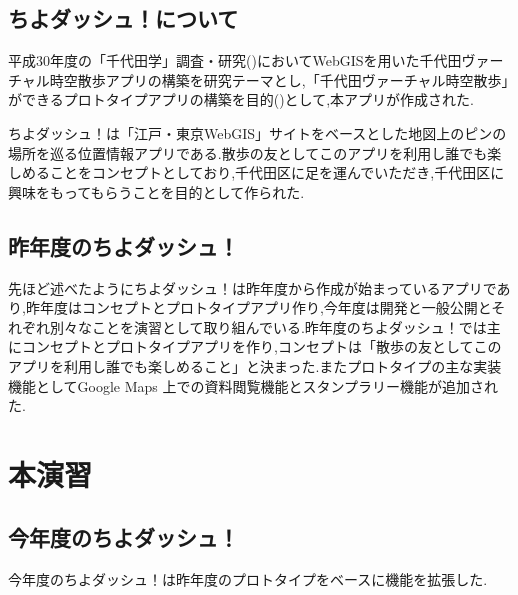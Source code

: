 \documentclass[a4paper, twoside]{jarticle}
\begin{document}
\begin{multicols}{2}
\subsection{ちよダッシュ！について}
平成30年度の「千代田学」調査・研究(\cite{tiyokenkyu})においてWebGISを用いた千代田ヴァーチャル時空散歩アプリの構築を研究テーマとし,「千代田ヴァーチャル時空散歩」ができるプロトタイプアプリの構築を目的(\cite{tiyodagaku_houkokusyo})として,本アプリが作成された.

ちよダッシュ！は「江戸・東京WebGIS」サイトをベースとした地図上のピンの場所を巡る位置情報アプリである.散歩の友としてこのアプリを利用し誰でも楽しめることをコンセプトとしており,千代田区に足を運んでいただき,千代田区に興味をもってもらうことを目的として作られた.

\subsection{昨年度のちよダッシュ！}
先ほど述べたようにちよダッシュ！は昨年度から作成が始まっているアプリであり,昨年度はコンセプトとプロトタイプアプリ作り,今年度は開発と一般公開とそれぞれ別々なことを演習として取り組んでいる.昨年度のちよダッシュ！では主にコンセプトとプロトタイプアプリを作り,コンセプトは「散歩の友としてこのアプリを利用し誰でも楽しめること」と決まった.またプロトタイプの主な実装機能としてGoogle Maps 上での資料閲覧機能とスタンプラリー機能が追加された.


\section{本演習}


\subsection{今年度のちよダッシュ！}
今年度のちよダッシュ！は昨年度のプロトタイプをベースに機能を拡張した.


\end{multicols}
\end{document}
